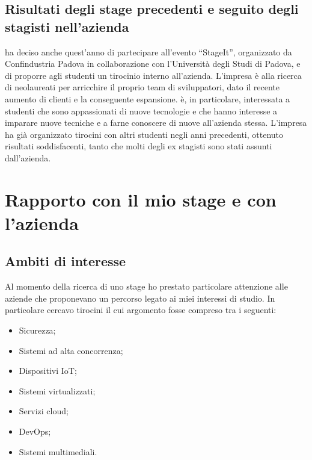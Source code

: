    \subsection{Risultati degli stage precedenti e seguito degli stagisti nell'azienda}
   \nomeAzienda{} ha deciso anche quest'anno di partecipare all'evento ``StageIt'', organizzato da Confindustria Padova in collaborazione con l'Università degli Studi di Padova, e di proporre agli studenti un tirocinio interno all'azienda. L'impresa è alla ricerca di neolaureati per arricchire il proprio team di sviluppatori, dato il recente aumento di clienti e la conseguente espansione.
   \nomeAzienda{} è, in particolare, interessata a studenti che sono appassionati di nuove tecnologie e che hanno interesse a imparare nuove tecniche e a farne conoscere di nuove all'azienda stessa.
   L'impresa ha già organizzato tirocini con altri studenti negli anni precedenti, ottenuto risultati soddisfacenti, tanto che molti degli ex stagisti sono stati assunti dall'azienda.

\section{Rapporto con il mio stage e con l'azienda}
   \subsection{Ambiti di interesse}
   Al momento della ricerca di uno stage ho prestato particolare attenzione alle aziende che proponevano un percorso legato ai miei interessi di studio. In particolare cercavo tirocini il cui argomento fosse compreso tra i seguenti:
   \begin{itemize}
      \item{Sicurezza;}
      \item{Sistemi ad alta concorrenza;}
      \item{Dispositivi IoT;}
      \item{Sistemi virtualizzati;}
      \item{Servizi cloud;}
      \item{DevOps;}
      \item{Sistemi multimediali.}
   \end{itemize}

